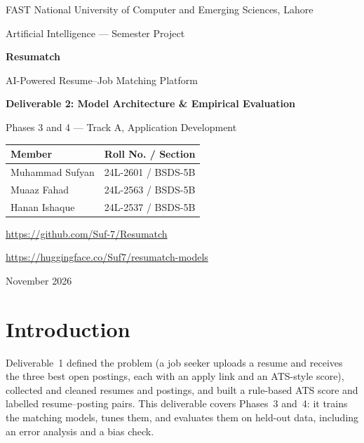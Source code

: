\documentclass[11pt,a4paper]{article}
\begin{document}
\begin{titlepage}
\centering
{\large FAST National University of Computer and Emerging Sciences, Lahore\par}
\vspace{0.3em}
{\normalsize Artificial Intelligence --- Semester Project\par}
\vspace{4.5em}
{\fontsize{40}{46}\selectfont\bfseries\color{rmblue} Resumatch\par}
\vspace{0.6em}
{\Large AI-Powered Resume--Job Matching Platform\par}
\vspace{3em}
{\large\bfseries Deliverable 2: Model Architecture \& Empirical Evaluation\par}
\vspace{0.4em}
{\normalsize Phases 3 and 4 --- Track A, Application Development\par}
\vspace{4em}
\begin{tabular}{ll}
\toprule
\textbf{Member} & \textbf{Roll No. / Section}\\
\midrule
Muhammad Sufyan & 24L-2601 / BSDS-5B\\
Muaaz Fahad & 24L-2563 / BSDS-5B\\
Hanan Ishaque & 24L-2537 / BSDS-5B\\
\bottomrule
\end{tabular}
\vspace{2.5em}
{\normalsize\url{https://github.com/Suf-7/Resumatch}\par}
\vspace{0.4em}
{\normalsize\url{https://huggingface.co/Suf7/resumatch-models}\par}
\vfill
{\large November 2026\par}
\end{titlepage}

\tableofcontents
\thispagestyle{fancy}
\newpage

\section{Introduction}
Deliverable~1 defined the problem (a job seeker uploads a resume and receives the three best open
postings, each with an apply link and an ATS-style score), collected and cleaned
\ResFinal resumes and \JobFinal postings, and built a rule-based ATS score and \Pairs labelled
resume--posting pairs. This deliverable covers Phases~3 and~4: it trains the matching models,
tunes them, and evaluates them on held-out data, including an error analysis and a bias check.
\end{document}

